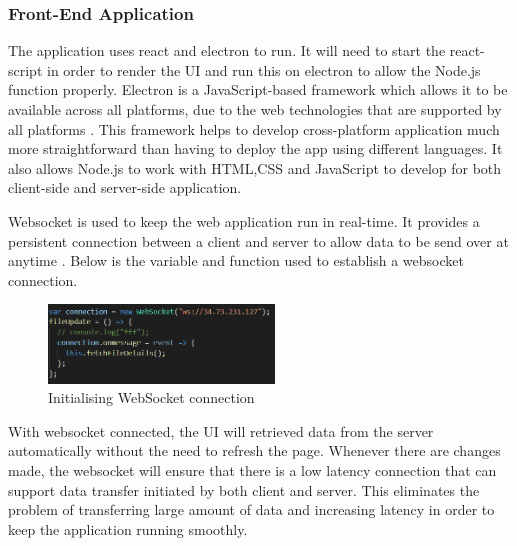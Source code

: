 \documentclass{article}
\begin{document}
\subsubsection {Front-End Application}
The application uses react and electron to run. It will need to start the react-script in order to render the UI and run this on electron to allow the Node.js function properly. Electron is a JavaScript-based framework which allows it to be available across all platforms, due to the web technologies that are supported by all platforms \cite{c4}. This framework helps to develop cross-platform application much more straightforward than having to deploy the app using different languages. It also allows Node.js to work with HTML,CSS and JavaScript to develop for both client-side and server-side application.

Websocket is used to keep the web application run in real-time. It provides a persistent connection between a client and server to allow data to be send over at anytime \cite{c13}. Below is the variable and function used to establish a websocket connection.

\begin{figure}[H]
\begin{center}
\includegraphics[width=6cm]{websocket.PNG}
\end{center}
\caption{Initialising WebSocket connection}\label{ex4}
\end{figure}

With websocket connected, the UI will retrieved data from the server automatically without the need to refresh the page. Whenever there are changes made, the websocket will ensure that there is a low latency connection that can support data transfer initiated by both client and server. This eliminates the problem of transferring large amount of data and increasing latency in order to keep the application running smoothly.
\end{document}
